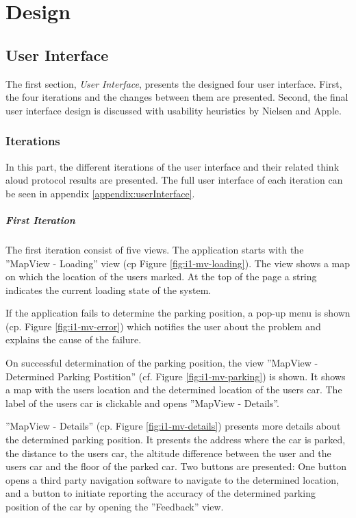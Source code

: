 \chapter{Design}

\section{User Interface}
The first section, \textit{User Interface}, presents the designed four user interface. First, the four iterations and the changes between them are presented. Second, the final user interface design is discussed with usability heuristics by Nielsen and Apple.

\subsection{Iterations}
In this part, the different iterations of the user interface and their related think aloud protocol results are presented. The full user interface of each iteration can be seen in appendix \ref{appendix:userInterface}.

\paragraph{First Iteration}

The first iteration consist of five views. The application starts with the ''MapView - Loading'' view (cp Figure \ref{fig:i1-mv-loading}). The view shows a map on which the location of the users marked. At the top of the page a string indicates the current loading state of the system.

If the application fails to determine the parking position, a pop-up menu is shown (cp. Figure \ref{fig:i1-mv-error}) which notifies the user about the problem and explains the cause of the failure. 

On successful determination of the parking position, the view ''MapView - Determined Parking Postition'' (cf. Figure \ref{fig:i1-mv-parking}) is shown. It shows a map with the users location and the determined location of the users car. The label of the users car is clickable and opens ''MapView - Details''. 

''MapView - Details'' (cp. Figure \ref{fig:i1-mv-details}) presents more details about the determined parking position. It presents the address where the car is parked, the distance to the users car, the altitude difference between the user and the users car and the floor of the parked car. Two buttons are presented: One button opens a third party navigation software to navigate to the determined location, and a button to initiate reporting the accuracy of the determined parking position of the car by opening the ''Feedback'' view.

